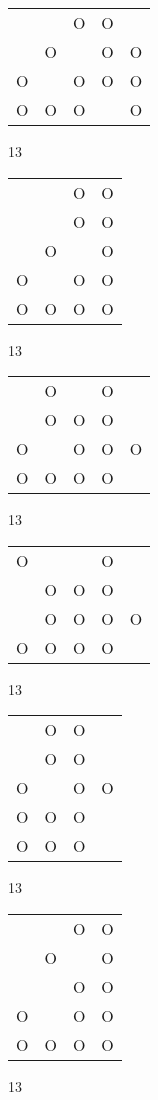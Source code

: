\begin{tabular}{|m{0.2cm}m{0.2cm}m{0.2cm}m{0.2cm}m{0.2cm}|}\hline
 & &O&O& \\
 &O& &O&O\\
O& &O&O&O\\
O&O&O& &O\\
\hline\end{tabular}13
\begin{tabular}{|m{0.2cm}m{0.2cm}m{0.2cm}m{0.2cm}|}\hline
 & &O&O\\
 & &O&O\\
 &O& &O\\
O& &O&O\\
O&O&O&O\\
\hline\end{tabular}13
\begin{tabular}{|m{0.2cm}m{0.2cm}m{0.2cm}m{0.2cm}m{0.2cm}|}\hline
 &O& &O& \\
 &O&O&O& \\
O& &O&O&O\\
O&O&O&O& \\
\hline\end{tabular}13
\begin{tabular}{|m{0.2cm}m{0.2cm}m{0.2cm}m{0.2cm}m{0.2cm}|}\hline
O& & &O& \\
 &O&O&O& \\
 &O&O&O&O\\
O&O&O&O& \\
\hline\end{tabular}13
\begin{tabular}{|m{0.2cm}m{0.2cm}m{0.2cm}m{0.2cm}|}\hline
 &O&O& \\
 &O&O& \\
O& &O&O\\
O&O&O& \\
O&O&O& \\
\hline\end{tabular}13
\begin{tabular}{|m{0.2cm}m{0.2cm}m{0.2cm}m{0.2cm}|}\hline
 & &O&O\\
 &O& &O\\
 & &O&O\\
O& &O&O\\
O&O&O&O\\
\hline\end{tabular}13
